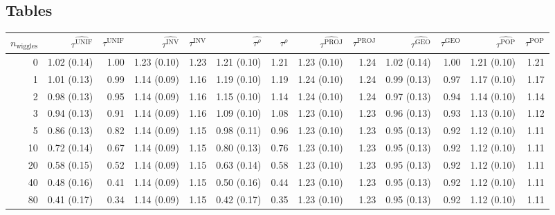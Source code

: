 \documentclass[letter,12pt]{article}
\newcommand{\unifavg}{\tau^{\mathrm{UNIF}}}
\newcommand{\invvar}{\tau^{\mathrm{INV}}}
\newcommand{\taurho}{\tau^{\rho}}
\newcommand{\tauproj}{\tau^{\mathrm{PROJ}}}
\newcommand{\taugeo}{\tau^{\mathrm{GEO}}}
\newcommand{\taupop}{\tau^{\mathrm{POP}}}
\begin{document}
\begin{landscape}

    \hypertarget{tables}{%
    \section{Tables}\label{tables}}
    \label{sec:tables}

    \begin{table}[!h]
        \begin{tabular}{r|rrrrrrrrrrrr}
            \hline
            $n_{\mathrm{wiggles}}$ & $\widehat{\unifavg}$ & $\unifavg$ & $\widehat{\invvar}$ & $\invvar$ & $\widehat{\taurho}$ & $\taurho$ & $\widehat{\tauproj}$ & $\tauproj$ & $\widehat{\taugeo}$ & $\taugeo$ & $\widehat{\taupop}$ & $\taupop$\\
            \hline
            0        & 1.02 (0.14) & 1.00    & 1.23 (0.10) & 1.23   & 1.21 (0.10) & 1.21   & 1.23 (0.10) & 1.24    & 1.02 (0.14) & 1.00   & 1.21 (0.10) & 1.21   \\
            1        & 1.01 (0.13) & 0.99    & 1.14 (0.09) & 1.16   & 1.19 (0.10) & 1.19   & 1.24 (0.10) & 1.24    & 0.99 (0.13) & 0.97   & 1.17 (0.10) & 1.17   \\
            2        & 0.98 (0.13) & 0.95    & 1.14 (0.09) & 1.16   & 1.15 (0.10) & 1.14   & 1.24 (0.10) & 1.24    & 0.97 (0.13) & 0.94   & 1.14 (0.10) & 1.14   \\
            3        & 0.94 (0.13) & 0.91    & 1.14 (0.09) & 1.16   & 1.09 (0.10) & 1.08   & 1.23 (0.10) & 1.23    & 0.96 (0.13) & 0.93   & 1.13 (0.10) & 1.12   \\
            5        & 0.86 (0.13) & 0.82    & 1.14 (0.09) & 1.15   & 0.98 (0.11) & 0.96   & 1.23 (0.10) & 1.23    & 0.95 (0.13) & 0.92   & 1.12 (0.10) & 1.11   \\
            10       & 0.72 (0.14) & 0.67    & 1.14 (0.09) & 1.15   & 0.80 (0.13) & 0.76   & 1.23 (0.10) & 1.23    & 0.95 (0.13) & 0.92   & 1.12 (0.10) & 1.11   \\
            20       & 0.58 (0.15) & 0.52    & 1.14 (0.09) & 1.15   & 0.63 (0.14) & 0.58   & 1.23 (0.10) & 1.23    & 0.95 (0.13) & 0.92   & 1.12 (0.10) & 1.11   \\
            40       & 0.48 (0.16) & 0.41    & 1.14 (0.09) & 1.15   & 0.50 (0.16) & 0.44   & 1.23 (0.10) & 1.23    & 0.95 (0.13) & 0.92   & 1.12 (0.10) & 1.11   \\
            80       & 0.41 (0.17) & 0.34    & 1.14 (0.09) & 1.15   & 0.42 (0.17) & 0.35   & 1.23 (0.10) & 1.23    & 0.95 (0.13) & 0.92   & 1.12 (0.10) & 1.11   \\

\end{tabular}
\end{table}
\end{landscape}
\end{document}
